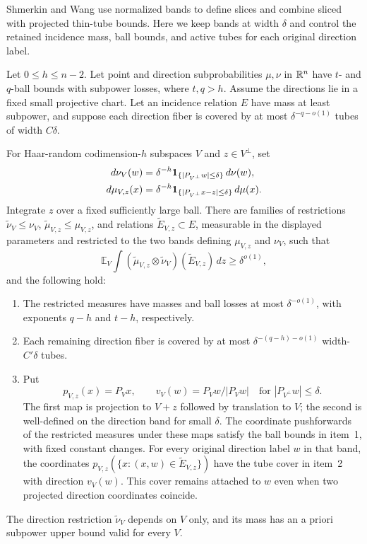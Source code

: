 Shmerkin and Wang \cite[Sections~6.1--6.3]{SW2025} use normalized bands
to define slices and combine sliced with projected thin-tube bounds.
Here we keep bands at width $\delta$ and control the retained incidence
mass, ball bounds, and active tubes for each original direction label.

\begin{lemma}\label{ang:slice-selection}
Let $0\le h\le n-2$. Let point and direction subprobabilities $\mu,\nu$ in $\mathbb R^n$ have
$t$- and $q$-ball bounds with subpower losses, where $t,q>h$.
Assume the directions lie in a fixed small projective chart. Let an
incidence relation $E$ have mass at least subpower, and suppose each
direction fiber is covered by at most $\delta^{-q-o(1)}$ tubes of
width $C\delta$.

For Haar-random codimension-$h$ subspaces $V$ and
$z\in V^\perp$, set
\begin{align*}
 d\nu_V(w)&=\delta^{-h}\mathbf 1_{\{|P_{V^\perp}w|\le\delta\}}\,d\nu(w),\\
 d\mu_{V,z}(x)&=\delta^{-h}
       \mathbf 1_{\{|P_{V^\perp}x-z|\le\delta\}}\,d\mu(x).
\end{align*}
Integrate $z$ over a fixed sufficiently large ball. There are families of restrictions
$\widetilde\nu_V\le\nu_V$, $\widetilde\mu_{V,z}\le\mu_{V,z}$,
and relations $\widetilde E_{V,z}\subset E$, measurable in the displayed
parameters and restricted to the two bands defining $\mu_{V,z}$ and
$\nu_V$, such that
\[
 \mathbb E_V\int
 (\widetilde\mu_{V,z}\otimes\widetilde\nu_V)(\widetilde E_{V,z})\,dz
 \ge\delta^{o(1)},
\]
and the following hold:
\begin{enumerate}
\item The restricted measures have masses and ball losses at most
$\delta^{-o(1)}$, with exponents $q-h$ and $t-h$, respectively.
\item Each remaining direction fiber is covered by at most
$\delta^{-(q-h)-o(1)}$ width-$C'\delta$ tubes.
\item Put
\[
 p_{V,z}(x)=P_Vx,\qquad v_V(w)=P_Vw/|P_Vw|
 \quad\text{for }|P_{V^\perp}w|\le\delta.
\]
The first map is projection to $V+z$ followed by translation to $V$;
the second is well-defined on the direction band for small $\delta$.
The coordinate pushforwards of the restricted measures under these maps
satisfy the ball bounds in item~1, with fixed constant changes. For every
original direction label $w$ in that band, the coordinates
$p_{V,z}(\{x:(x,w)\in\widetilde E_{V,z}\})$ have the tube cover in
item~2 with direction $v_V(w)$. This cover remains attached to $w$ even
when two projected direction coordinates coincide.
\end{enumerate}
The direction restriction $\widetilde\nu_V$ depends on $V$ only, and its
mass has an a priori subpower upper bound valid for every $V$.
\end{lemma}

